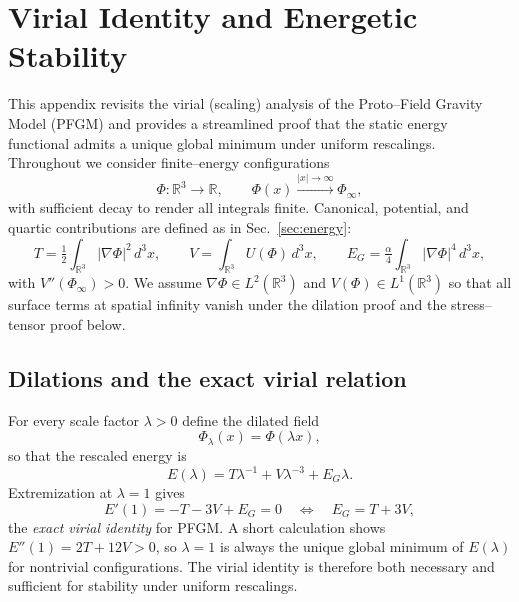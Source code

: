 \documentclass{article}
\begin{document}

\section{Virial Identity and Energetic Stability}
\label{app:virial}

This appendix revisits the virial (scaling) analysis of the Proto--Field Gravity Model (PFGM) and provides a streamlined proof that the static energy functional admits a unique global minimum under uniform rescalings. Throughout we consider finite--energy configurations 
\[
\Phi:\mathbb{R}^3 \to \mathbb{R}, \qquad 
\Phi(x)\xrightarrow{|x|\to\infty}\Phi_\infty ,
\]
with sufficient decay to render all integrals finite. Canonical, potential, and quartic contributions are defined as in Sec.~\ref{sec:energy}:
\begin{equation}
T = \tfrac12 \!\int_{\mathbb{R}^3} |\nabla\Phi|^2\, d^3x, 
\qquad 
V = \int_{\mathbb{R}^3} U(\Phi)\, d^3x, 
\qquad 
E_G = \tfrac{\alpha}{4} \!\int_{\mathbb{R}^3} |\nabla\Phi|^4\, d^3x ,
\label{eq:appendix_defs}
\end{equation}
with $V''(\Phi_\infty)>0$.
We assume $\nabla\Phi\in L^2(\mathbb{R}^3)$ and $V(\Phi)\in L^1(\mathbb{R}^3)$ so that all surface terms at spatial infinity vanish under the dilation proof and the stress–tensor proof below.


\subsection{Dilations and the exact virial relation}
For every scale factor $\lambda>0$ define the dilated field
\[
\Phi_\lambda(x) = \Phi(\lambda x),
\]
so that the rescaled energy is
\begin{equation}
E(\lambda) = T \lambda^{-1} + V \lambda^{-3} + E_G \lambda .
\label{eq:appendix_dilatedE}
\end{equation}
Extremization at $\lambda=1$ gives
\begin{equation}
E'(1) = -T - 3V + E_G = 0 
\quad \Longleftrightarrow \quad 
E_G = T + 3V ,
\label{eq:appendix_virial}
\end{equation}
the \emph{exact virial identity} for PFGM. A short calculation shows $E''(1)=2T+12V>0$, so $\lambda=1$ is always the unique global minimum of $E(\lambda)$ for nontrivial configurations. The virial identity is therefore both necessary and sufficient for stability under uniform rescalings.
\end{document}
